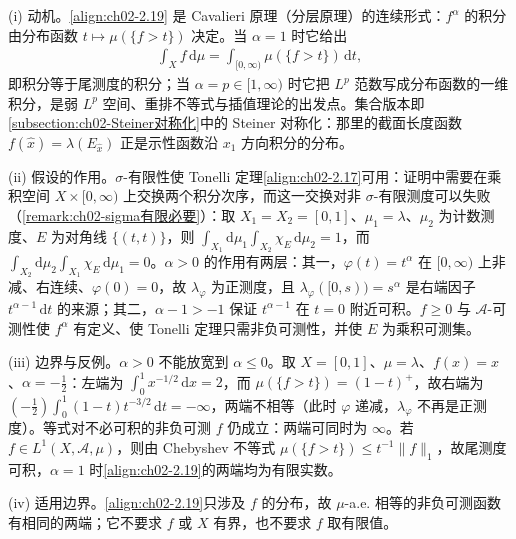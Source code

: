 \documentclass[../../main.tex]{subfiles}%
\begin{document}
\begin{remark}\label{remark:ch02-尾部积分动机}
(i) 动机。\eqref{align:ch02-2.19} 是 Cavalieri 原理（分层原理）的连续形式：$f^\alpha$ 的积分由分布函数 $t\mapsto\mu(\{f>t\})$ 决定。当 $\alpha=1$ 时它给出
\begin{align*}
\int_Xf\,\mathrm{d}\mu=\int_{[0,\infty)}\mu(\{f>t\})\,\mathrm{d}t,
\end{align*}
即积分等于尾测度的积分；当 $\alpha=p\in[1,\infty)$ 时它把 $L^p$ 范数写成分布函数的一维积分，是弱 $L^p$ 空间、重排不等式与插值理论的出发点。集合版本即\cref{subsection:ch02-Steiner对称化}中的 Steiner 对称化：那里的截面长度函数 $f(\hat x)=\lambda(E_{\hat x})$ 正是示性函数沿 $x_1$ 方向积分的分布。

(ii) 假设的作用。$\sigma$-有限性使 Tonelli 定理\eqref{align:ch02-2.17}可用：证明中需要在乘积空间 $X\times[0,\infty)$ 上交换两个积分次序，而这一交换对非 $\sigma$-有限测度可以失败（\cref{remark:ch02-sigma有限必要}）：取 $X_1=X_2=[0,1]$、$\mu_1=\lambda$、$\mu_2$ 为计数测度、$E$ 为对角线 $\{(t,t)\}$，则 $\int_{X_1}\mathrm{d}\mu_1\int_{X_2}\chi_E\,\mathrm{d}\mu_2=1$，而 $\int_{X_2}\mathrm{d}\mu_2\int_{X_1}\chi_E\,\mathrm{d}\mu_1=0$。$\alpha>0$ 的作用有两层：其一，$\varphi(t)=t^\alpha$ 在 $[0,\infty)$ 上非减、右连续、$\varphi(0)=0$，故 $\lambda_\varphi$ 为正测度，且 $\lambda_\varphi([0,s))=s^\alpha$ 是右端因子 $t^{\alpha-1}\,\mathrm{d}t$ 的来源；其二，$\alpha-1>-1$ 保证 $t^{\alpha-1}$ 在 $t=0$ 附近可积。$f\geqslant0$ 与 $\mathscr A$-可测性使 $f^\alpha$ 有定义、使 Tonelli 定理只需非负可测性，并使 $E$ 为乘积可测集。

(iii) 边界与反例。$\alpha>0$ 不能放宽到 $\alpha\leqslant0$。取 $X=[0,1]$、$\mu=\lambda$、$f(x)=x$、$\alpha=-\tfrac12$：左端为 $\int_0^1x^{-1/2}\,\mathrm{d}x=2$，而 $\mu(\{f>t\})=(1-t)^+$，故右端为 $(-\tfrac12)\int_0^1(1-t)t^{-3/2}\,\mathrm{d}t=-\infty$，两端不相等（此时 $\varphi$ 递减，$\lambda_\varphi$ 不再是正测度）。等式对不必可积的非负可测 $f$ 仍成立：两端可同时为 $\infty$。若 $f\in L^1(X,\mathscr A,\mu)$，则由 Chebyshev 不等式 $\mu(\{f>t\})\leqslant t^{-1}\|f\|_1$，故尾测度可积，$\alpha=1$ 时\eqref{align:ch02-2.19}的两端均为有限实数。

(iv) 适用边界。\eqref{align:ch02-2.19}只涉及 $f$ 的分布，故 $\mu$-a.e. 相等的非负可测函数有相同的两端；它不要求 $f$ 或 $X$ 有界，也不要求 $f$ 取有限值。
\end{remark}
\end{document}
